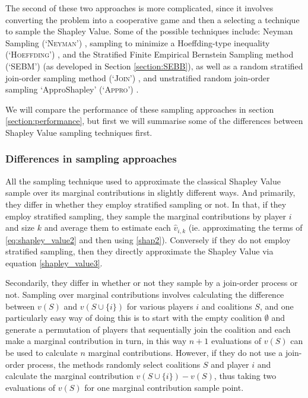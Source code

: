The second of these two approaches is more complicated, since it involves converting the problem into a cooperative game and then a selecting a technique to sample the Shapley Value.
Some of the possible techniques include: Neyman Sampling (`\textsc{Neyman}') \cite{CASTRO2017180,1938.10503378}, sampling to minimize a Hoeffding-type inequality (`\textsc{Hoeffding}') \cite{2013arXiv1306.4265M}, and the Stratified Finite Empirical Bernstein Sampling method (`SEBM') (as developed in Section \ref{section:SEBB}), as well as a random stratified join-order sampling method (`\textsc{Join}') \cite{CASTRO2017180}, and unstratified random join-order sampling `ApproShapley' (`\textsc{Appro}') \cite{DBLP:journals/cor/CastroGT09}.

We will compare the performance of these sampling approaches in section \ref{section:performance}, but first we will summarise some of the differences between Shapley Value sampling techniques first.

\subsubsection*{Differences in sampling approaches}

All the sampling technique used to approximate the classical Shapley Value sample over its marginal contributions in slightly different ways.
And primarily, they differ in whether they employ stratified sampling or not.
In that, if they employ stratified sampling, they sample the marginal contributions by player $i$ and size $k$ and average them to estimate each $\hat{v}_{i,k}$ (ie. approximating the terms of \eqref{eq:shapley_value2} and then using \eqref{shap2}).
Conversely if they do not employ stratified sampling, then they directly approximate the Shapley Value via equation \eqref{shapley_value3}.

Secondarily, they differ in whether or not they sample by a join-order process or not. Sampling over marginal contributions involves calculating the difference between $v(S)$ and $v(S\cup\{i\})$ for various players $i$ and coalitions $S$, and one particularly easy way of doing this is to start with the empty coalition $\emptyset$ and generate a permutation of players that sequentially join the coalition and each make a marginal contribution in turn, in this way $n+1$ evaluations of $v(S)$ can be used to calculate $n$ marginal contributions.%
However, if they do not use a join-order process, the methods randomly select coalitions $S$ and player $i$ and calculate the marginal contribution $v(S\cup\{i\}) - v(S)$, thus taking two evaluations of $v(S)$ for one marginal contribution sample point.

